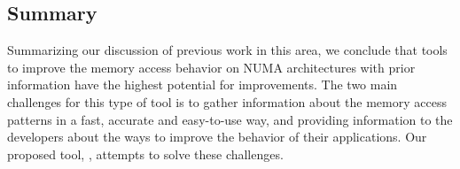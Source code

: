 \subsection{Summary}

Summarizing our discussion of previous work in this area, we conclude that tools to improve the memory access behavior on NUMA architectures with prior information have the highest potential for improvements.
The two main challenges for this type of tool is to gather information about the memory access patterns in a fast, accurate and easy-to-use way, and providing information to the developers about the ways to improve the behavior of their applications.
Our proposed tool, \TABARNAC, attempts to solve these challenges.



